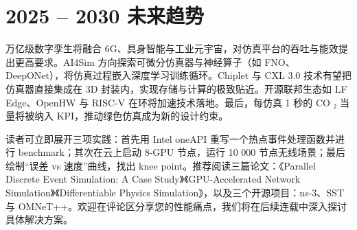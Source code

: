 \chapter{2025 – 2030 未来趋势}
万亿级数字孪生将融合 6G、具身智能与工业元宇宙，对仿真平台的吞吐与能效提出更高要求。AI4Sim 方向探索可微分仿真器与神经算子（如 FNO、DeepONet），将仿真过程嵌入深度学习训练循环。Chiplet 与 CXL 3.0 技术有望把仿真器直接集成在 3D 封装内，实现存储与计算的极致贴近。开源联邦生态如 LF Edge、OpenHW 与 RISC-V 在环将加速技术落地。最后，每仿真 1 秒的 CO ₂ 当量将被纳入 KPI，推动绿色仿真成为新的设计约束。\par
读者可立即展开三项实践：首先用 Intel oneAPI 重写一个热点事件处理函数并进行 benchmark；其次在云上启动 8-GPU 节点，运行 10 000 节点无线场景；最后绘制“误差 vs 速度”曲线，找出 knee point。推荐阅读三篇论文：《Parallel Discrete Event Simulation: A Case Study》《GPU-Accelerated Network Simulation》《Differentiable Physics Simulation》，以及三个开源项目：ns-3、SST 与 OMNeT++。欢迎在评论区分享您的性能痛点，我们将在后续连载中深入探讨具体解决方案。\par
